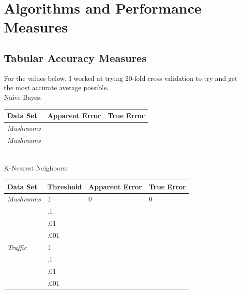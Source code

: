 \documentclass{article}
\begin{document}

\section{Algorithms and Performance Measures}
\subsection{Tabular Accuracy Measures}
For the values below, I worked at trying 20-fold cross validation to try and get the most accurate average possible.
\\
Naive Bayes:\\
\begin{tabular}{ | l | l | l |}
  \hline
  \textbf{Data Set} & \textbf{Apparent Error} & \textbf{True Error} \\ \hline
  \textit{Mushrooms} & & \\ \hline
  \textit{Mushrooms} & & \\ \hline
\end{tabular}
\\
K-Nearest Neighbors:\\
\begin{tabular}{ | l | l | l | l | }
  \hline			
  \textbf{Data Set} & Threshold & \textbf{Apparent Error} & \textbf{True Error} \\ \hline
  \textit{Mushrooms} & 1 & 0 & 0 \\
    & .1 & & \\
    & .01 & & \\
    & .001 & & \\ \hline
  \textit{Traffic} & 1 & & \\
    & .1 & & \\
    & .01 & & \\
    & .001 & & \\\hline
\end{tabular}
\end{document}
